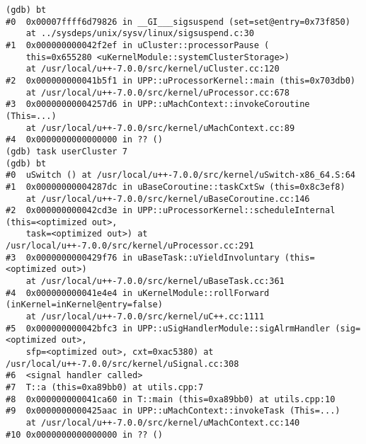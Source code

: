 \begin{lstlisting}[caption={Context switch version of task command}, label={pushtask-id}]
(gdb) bt
#0  0x00007ffff6d79826 in __GI___sigsuspend (set=set@entry=0x73f850)
    at ../sysdeps/unix/sysv/linux/sigsuspend.c:30
#1  0x000000000042f2ef in uCluster::processorPause (
    this=0x655280 <uKernelModule::systemClusterStorage>)
    at /usr/local/u++-7.0.0/src/kernel/uCluster.cc:120
#2  0x000000000041b5f1 in UPP::uProcessorKernel::main (this=0x703db0)
    at /usr/local/u++-7.0.0/src/kernel/uProcessor.cc:678
#3  0x00000000004257d6 in UPP::uMachContext::invokeCoroutine (This=...)
    at /usr/local/u++-7.0.0/src/kernel/uMachContext.cc:89
#4  0x0000000000000000 in ?? ()
(gdb) task userCluster 7
(gdb) bt
#0  uSwitch () at /usr/local/u++-7.0.0/src/kernel/uSwitch-x86_64.S:64
#1  0x00000000004287dc in uBaseCoroutine::taskCxtSw (this=0x8c3ef8)
    at /usr/local/u++-7.0.0/src/kernel/uBaseCoroutine.cc:146
#2  0x000000000042cd3e in UPP::uProcessorKernel::scheduleInternal (this=<optimized out>,
    task=<optimized out>) at /usr/local/u++-7.0.0/src/kernel/uProcessor.cc:291
#3  0x0000000000429f76 in uBaseTask::uYieldInvoluntary (this=<optimized out>)
    at /usr/local/u++-7.0.0/src/kernel/uBaseTask.cc:361
#4  0x000000000041e4e4 in uKernelModule::rollForward (inKernel=inKernel@entry=false)
    at /usr/local/u++-7.0.0/src/kernel/uC++.cc:1111
#5  0x000000000042bfc3 in UPP::uSigHandlerModule::sigAlrmHandler (sig=<optimized out>,
    sfp=<optimized out>, cxt=0xac5380) at /usr/local/u++-7.0.0/src/kernel/uSignal.cc:308
#6  <signal handler called>
#7  T::a (this=0xa89bb0) at utils.cpp:7
#8  0x000000000041ca60 in T::main (this=0xa89bb0) at utils.cpp:10
#9  0x0000000000425aac in UPP::uMachContext::invokeTask (This=...)
    at /usr/local/u++-7.0.0/src/kernel/uMachContext.cc:140
#10 0x0000000000000000 in ?? ()
\end{lstlisting}

